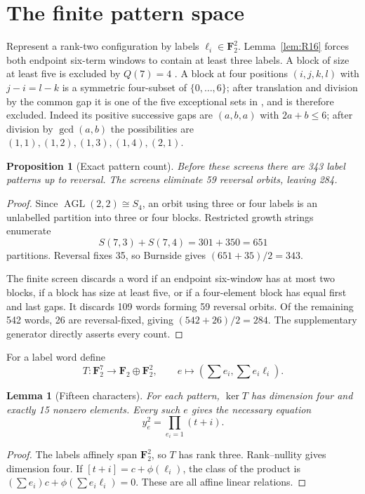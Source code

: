 \documentclass[11pt]{article}
\newtheorem{proposition}[theorem]{Proposition}
\newtheorem{lemma}[theorem]{Lemma}
\newcommand{\F}{\mathbf F}
\begin{document}
\section{The finite pattern space}
Represent a rank-two configuration by labels $\ell_i\in\F_2^2$.
Lemma~\ref{lem:R16} forces both endpoint six-term windows to
contain at least three labels. A block of size at least five is excluded by
$Q(7)=4$ \cite[Corollary~6]{GJXRudin}. A block at four positions
$(i,j,k,l)$ with $j-i=l-k$ is a symmetric four-subset of
$\{0,\ldots,6\}$; after translation and division by the common gap it is
one of the five exceptional sets in \cite[Proposition~5]{GJXRudin}, and is
therefore excluded. Indeed its positive successive gaps are $(a,b,a)$ with
$2a+b\leq6$; after division by $\gcd(a,b)$ the possibilities are
$(1,1),(1,2),(1,3),(1,4),(2,1)$.

\begin{proposition}[Exact pattern count]\label{prop:count}
Before these screens there are 343 label patterns up to reversal. The
screens eliminate 59 reversal orbits, leaving 284.
\end{proposition}
\begin{proof}
Since $\operatorname{AGL}(2,2)\cong S_4$, an orbit using three or four
labels is an unlabelled partition into three or four blocks. Restricted
growth strings enumerate
\[
 S(7,3)+S(7,4)=301+350=651
\]
partitions. Reversal fixes 35, so Burnside gives $(651+35)/2=343$.

The finite screen discards a word if an endpoint six-window has at most
two blocks, if a block has size at least five, or if a four-element block
has equal first and last gaps. It discards 109 words forming 59 reversal
orbits. Of the remaining 542 words, 26 are reversal-fixed, giving
$(542+26)/2=284$. The supplementary generator directly asserts every
count.
\end{proof}

For a label word define
\[
 T:\F_2^7\longrightarrow\F_2\oplus\F_2^2,\qquad
 e\longmapsto\left(\sum e_i,\sum e_i\ell_i\right).
\]
\begin{lemma}[Fifteen characters]\label{lem:15}
For each pattern, $\ker T$ has dimension four and exactly 15 nonzero
elements. Every such $e$ gives the necessary equation
\[
 y_e^2=\prod_{e_i=1}(t+i).
\]
\end{lemma}
\begin{proof}
The labels affinely span $\F_2^2$, so $T$ has rank three. Rank--nullity
gives dimension four. If $[t+i]=c+\phi(\ell_i)$, the class of the product
is $(\sum e_i)c+\phi(\sum e_i\ell_i)=0$. These are all affine linear
relations.
\end{proof}
\end{document}
